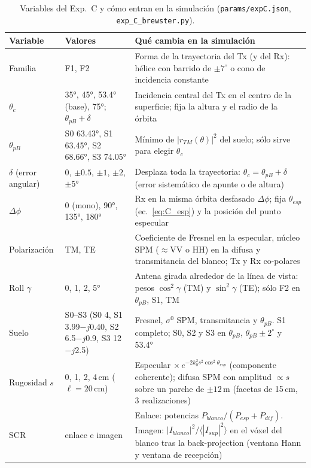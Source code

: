 \begin{table}[H]
\centering\small
\caption{Variables del Exp.~C y cómo entran en la simulación (\texttt{params/expC.json},
\texttt{exp\_C\_brewster.py}).}
\label{tab:C_var}
\begin{tabular}{@{}L{2.5cm}L{3.3cm}L{8.6cm}@{}}
\toprule
\textbf{Variable} & \textbf{Valores} & \textbf{Qué cambia en la simulación} \\
\midrule
Familia & F1, F2 & Forma de la trayectoria del Tx (y del Rx): hélice con barrido de $\pm7^{\circ}$
o cono de incidencia constante \\
$\theta_c$ & 35°, 45°, 53.4° (base), 75°; $\theta_{pB}+\delta$ & Incidencia central del Tx en el
centro de la superficie; fija la altura y el radio de la órbita \\
$\theta_{pB}$ & S0 63.43°, S1 63.45°, S2 68.66°, S3 74.05° & Mínimo de $|r_{TM}(\theta)|^2$ del suelo;
sólo sirve para elegir $\theta_c$ \\
$\delta$ (error angular) & 0, $\pm0.5$, $\pm1$, $\pm2$, $\pm5$° & Desplaza toda la trayectoria:
$\theta_c=\theta_{pB}+\delta$ (error sistemático de apunte o de altura) \\
$\Delta\phi$ & 0 (mono), 90°, 135°, 180° & Rx en la misma órbita desfasado $\Delta\phi$; fija
$\theta_{esp}$ (ec.~\ref{eq:C_esp}) y la posición del punto especular \\
Polarización & TM, TE & Coeficiente de Fresnel en la especular, núcleo SPM ($\approx$VV o HH) en la
difusa y transmitancia del blanco; Tx y Rx co-polares \\
Roll $\gamma$ & 0, 1, 2, 5° & Antena girada alrededor de la línea de vista: pesos
$\cos^2\gamma$ (TM) y $\sin^2\gamma$ (TE); sólo F2 en $\theta_{pB}$, S1, TM \\
Suelo & S0--S3 (S0 4, S1 3.99$-j$0.40, S2 6.5$-j$0.9, S3 12$-j$2.5) & Fresnel, $\sigma^0$ SPM,
transmitancia y $\theta_{pB}$. S1 completo; S0, S2 y S3 en $\theta_{pB}$, $\theta_{pB}\pm2^{\circ}$ y 53.4° \\
Rugosidad $s$ & 0, 1, 2, 4\,cm ($\ell=20$\,cm) & Especular $\times\,e^{-2k_0^2s^2\cos^2\theta_{esp}}$
(componente coherente); difusa SPM con amplitud $\propto s$ sobre un parche de $\pm12$\,m
(facetas de 15\,cm, 3 realizaciones) \\
SCR & enlace e imagen & Enlace: potencias $P_{blanco}/(P_{esp}+P_{dif})$. Imagen:
$|I_{blanco}|^2/\langle|I_{sup}|^2\rangle$ en el vóxel del blanco tras la back-projection
(ventana Hann y ventana de recepción) \\
\bottomrule
\end{tabular}
\end{table}

